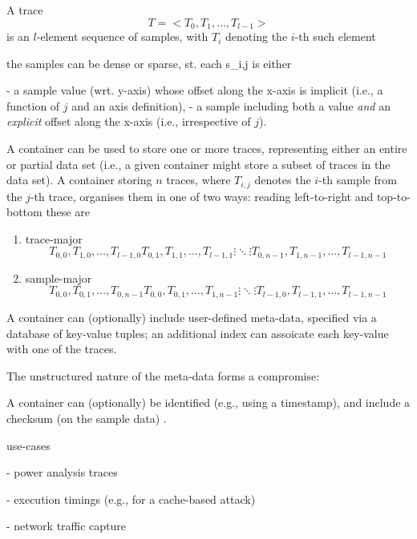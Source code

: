 \documentclass[10pt,a4paper]{llncs}
\begin{document}

A trace 
\[
T = < T_0, T_1, \ldots, T_{l-1} >
\]
is an $l$-element sequence of samples, with $T_i$ denoting the $i$-th such
element

the samples can be dense or sparse, st. each s_{i,j} is either

- a sample value (wrt. y-axis) whose offset along the x-axis is implicit 
  (i.e., a function of $j$ and an axis definition),
- a sample including both a value {\em and} an {\em explicit} offset along 
  the x-axis (i.e., irrespective of $j$).

A container can be used to store one or more traces, representing either an
entire or partial data set (i.e., a given container might store a subset of 
traces in the data set).  A container storing $n$ traces, where $T_{i,j}$ 
denotes the $i$-th sample from the $j$-th trace, organises them in one of 
two ways: reading left-to-right and top-to-bottom these are

\begin{enumerate}
\item trace-major 
      \[
      T_{  0,  0}, T_{  1,  0}, \ldots, T_{l-1,  0}
      T_{  0,  1}, T_{  1,  1}, \ldots, T_{l-1,  1}
      \vdots                    \ddots  \vdots
      T_{  0,n-1}, T_{  1,n-1}, \ldots, T_{l-1,n-1}
      \]
\item sample-major
      \[
      T_{  0,  0}, T_{  0,  1}, \ldots, T_{  0,n-1}
      T_{  0,  0}, T_{  0,  1}, \ldots, T_{  1,n-1}
      \vdots                    \ddots  \vdots
      T_{l-1,  0}, T_{l-1,  1}, \ldots, T_{l-1,n-1}
      \]
\end{enumerate}

\item A container can (optionally) include user-defined meta-data, specified
      via a database of key-value tuples; an additional index can assoicate 
      each key-value with one of the traces.  

      The unstructured nature of the meta-data forms a compromise: 

\item A container can (optionally) be identified (e.g., using a timestamp),  
      and include a checksum (on the sample data) .


use-cases

- power analysis traces

- execution timings (e.g., for a cache-based attack)

- network traffic capture

\end{document}
